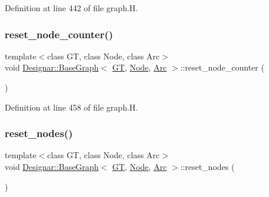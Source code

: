 Definition at line 442 of file graph.\+H.

\mbox{\label{class_designar_1_1_base_graph_a53603f64b51b470cc6b8c8d6d2b643a4}} 
\subsubsection{\texorpdfstring{reset\+\_\+node\+\_\+counter()}{reset\_node\_counter()}}
{\footnotesize\ttfamily template$<$class GT, class Node, class Arc$>$ \\
void \hyperlink{class_designar_1_1_base_graph}{Designar\+::\+Base\+Graph}$<$ \hyperlink{demo-buildgraph_8_c_a3001c40d2c31ca87ed96cd7d1334a55e}{GT}, \hyperlink{namespace_designar_a5af326c65aa2bd26b26c410f2030d09e}{Node}, \hyperlink{namespace_designar_a3f55fb5513d62ff47cbc8f72b8e95d6f}{Arc} $>$\+::reset\+\_\+node\+\_\+counter (\begin{DoxyParamCaption}{ }\end{DoxyParamCaption})\hspace{0.3cm}{\ttfamily [inline]}}



Definition at line 458 of file graph.\+H.

\mbox{\label{class_designar_1_1_base_graph_a1b21c48fed41f36ad4158d718f837c89}} 
\subsubsection{\texorpdfstring{reset\+\_\+nodes()}{reset\_nodes()}}
{\footnotesize\ttfamily template$<$class GT, class Node, class Arc$>$ \\
void \hyperlink{class_designar_1_1_base_graph}{Designar\+::\+Base\+Graph}$<$ \hyperlink{demo-buildgraph_8_c_a3001c40d2c31ca87ed96cd7d1334a55e}{GT}, \hyperlink{namespace_designar_a5af326c65aa2bd26b26c410f2030d09e}{Node}, \hyperlink{namespace_designar_a3f55fb5513d62ff47cbc8f72b8e95d6f}{Arc} $>$\+::reset\+\_\+nodes (\begin{DoxyParamCaption}{ }\end{DoxyParamCaption})\hspace{0.3cm}{\ttfamily [inline]}}




